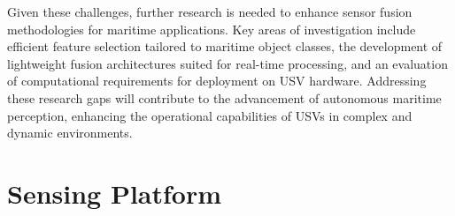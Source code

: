 \documentclass{erauthesis}
\begin{document}
Given these challenges, further research is needed to enhance sensor fusion methodologies for maritime applications. 
Key areas of investigation include efficient feature selection tailored to maritime object classes, the development of lightweight fusion architectures suited for real-time processing, and an evaluation of computational requirements for deployment on \ac{USV} hardware. 
Addressing these research gaps will contribute to the advancement of autonomous maritime perception, enhancing the operational capabilities of \acp{USV} in complex and dynamic environments.

\chapter{Sensing Platform} \label{sensing_platform}


\end{document}
